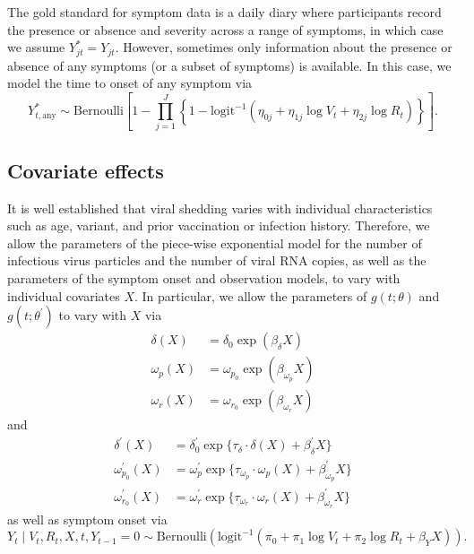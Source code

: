 \documentclass[11pt]{article}
\begin{document}
The gold standard for symptom data is a daily diary where participants record the presence or absence and severity across a range of symptoms, in which case we assume $Y^*_{jt} = Y_{jt}$. However, sometimes only information about the presence or absence of any symptoms (or a subset of symptoms) is available. In this case, we model the time to onset of any symptom via
\begin{equation*}
    Y^*_{t,\text{any}} \sim \text{Bernoulli}\left[1 - \prod_{j=1}^J \left\{1 - \text{logit}^{-1}(\eta_{0j} + \eta_{1j} \log V_t + \eta_{2j} \log R_t)\right\}\right].
\end{equation*}


\subsection{Covariate effects} 
It is well established that viral shedding varies with individual characteristics such as age, variant, and prior vaccination or infection history. Therefore, we allow the parameters of the piece-wise exponential model for the number of infectious virus particles and the number of viral RNA copies, as well as the parameters of the symptom onset and observation models, to vary with individual covariates $X$. In particular, we allow the parameters of $g(t; \theta)$ and $g(t; \theta^\prime)$ to vary with $X$ via
\begin{align*}
    \delta(X) &= \delta_0 \exp(\beta_\delta X) \\
    \omega_{p}(X) &= \omega_{p_0} \exp(\beta_{\omega_p} X) \\
    \omega_{r}(X) &= \omega_{r_0} \exp(\beta_{\omega_r} X)
\end{align*}
and 
\begin{align*}
    \delta^\prime(X) &= \delta^\prime_0 \exp\{\tau_{\delta} \cdot \delta(X) + \beta^\prime_\delta X\} \\
    \omega^\prime_{p_0}(X) &= \omega^\prime_{p} \exp\{\tau_{\omega_{p}} \cdot \omega_{p}(X) + \beta^\prime_{\omega_p} X\} \\
    \omega^\prime_{r_0}(X) &= \omega^\prime_{r} \exp\{\tau_{\omega_{r}} \cdot \omega_{r}(X) + \beta^\prime_{\omega_r} X\}
\end{align*}
as well as symptom onset via
\begin{equation*}
    Y_t \mid V_t, R_t, X, t, Y_{t-1} = 0 \sim \text{Bernoulli}(\text{logit}^{-1}(\pi_0 + \pi_1 \log V_t + \pi_2 \log R_t + \beta_{Y} X)).
\end{equation*}
\end{document}

